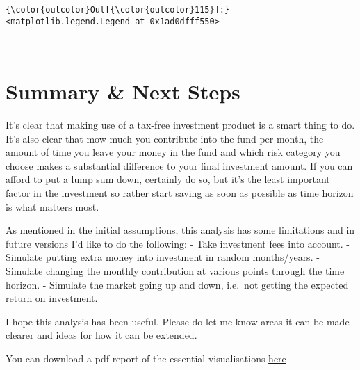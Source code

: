 \documentclass[11pt]{article}
\begin{document}
\begin{Verbatim}[commandchars=\\\{\}]
{\color{outcolor}Out[{\color{outcolor}115}]:} <matplotlib.legend.Legend at 0x1ad0dfff550>
\end{Verbatim}
            
    \begin{center}
    \end{center}
    { \hspace*{\fill} \\}
    
    \hypertarget{summary-next-steps}{%
\section{Summary \& Next Steps}\label{summary-next-steps}}

It's clear that making use of a tax-free investment product is a smart
thing to do. It's also clear that mow much you contribute into the fund
per month, the amount of time you leave your money in the fund and which
risk category you choose makes a substantial difference to your final
investment amount. If you can afford to put a lump sum down, certainly
do so, but it's the least important factor in the investment so rather
start saving as soon as possible as time horizon is what matters most.

As mentioned in the initial assumptions, this analysis has some
limitations and in future versions I'd like to do the following: - Take
investment fees into account. - Simulate putting extra money into
investment in random months/years. - Simulate changing the monthly
contribution at various points through the time horizon. - Simulate the
market going up and down, i.e.~not getting the expected return on
investment.

I hope this analysis has been useful. Please do let me know areas it can
be made clearer and ideas for how it can be extended.

You can download a pdf report of the essential visualisations
\href{}{here}


    
    
    
    
\end{document}
